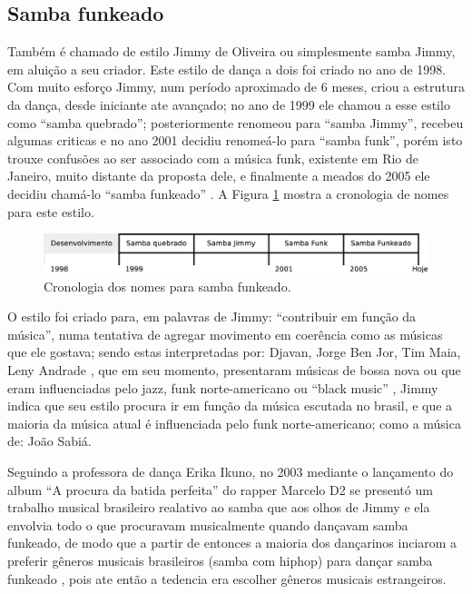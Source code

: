 \subsection{Samba funkeado}
\label{subsec:sambafunkeado}
Também é chamado de estilo Jimmy de Oliveira ou simplesmente  samba Jimmy, 
em aluição a seu criador.
Este estilo de dança a dois foi criado no ano de 1998.
Com muito esforço Jimmy, num período aproximado de 6 meses, 
criou a estrutura da dança, desde iniciante ate avançado;
no ano de 1999 ele  chamou a esse estilo como ``samba quebrado'';  
posteriormente renomeou  para ``samba Jimmy'', 
recebeu algumas criticas e no ano 2001 decidiu renomeá-lo para ``samba funk'',
porém isto trouxe confusões   ao ser associado com a música funk, existente em Rio de Janeiro,
muito distante da proposta dele, e
finalmente a meados do 2005 ele decidiu chamá-lo ``samba funkeado''  \cite{sambafunkeadoJimmyDeOliveiraPart1}.
A Figura \ref{fig:funkeadocrono1} mostra a cronologia de nomes para este estilo.
\begin{figure}[h]
  \centering
    \includegraphics[width=1.0\textwidth]{chapters/cap-historia-dancasamba/sambafunkeado.eps}
  \caption{Cronologia dos nomes para samba funkeado.}
\label{fig:funkeadocrono1}
\end{figure}

O estilo foi criado para, em palavras de Jimmy: ``contribuir em função da música'', 
numa tentativa de agregar movimento em coerência como as músicas que ele gostava;
sendo estas interpretadas por:
Djavan, Jorge Ben Jor, Tim Maia, Leny Andrade \cite{sambafunkeadoJimmyDeOliveiraPart1}, que em seu momento, 
presentaram músicas de bossa nova ou que eram influenciadas pelo jazz, 
funk norte-americano ou ``black music'' \cite{sambafunkeadoJimmyDeOliveiraPart1} \cite{sambafunkeadoJimmyDeOliveiraPart3},
Jimmy indica que seu estilo procura ir em função da música escutada no brasil, 
e que a maioria da música atual é influenciada pelo funk norte-americano;
como a música de: João Sabiá. 

 
Seguindo a professora de dança Erika Ikuno, no 2003 
mediante o lançamento do album ``A procura da batida perfeita'' do rapper Marcelo D2
se presentó um trabalho musical brasileiro realativo ao samba que aos olhos de Jimmy e ela
envolvia todo o que procuravam musicalmente quando dançavam samba funkeado,
de modo que a partir de entonces a maioria dos dançarinos inciarom a preferir gêneros 
musicais brasileiros (samba com hiphop) para dançar samba funkeado \cite[pp. 92]{filho2016tango},
pois ate então a tedencia era escolher gêneros musicais estrangeiros.

